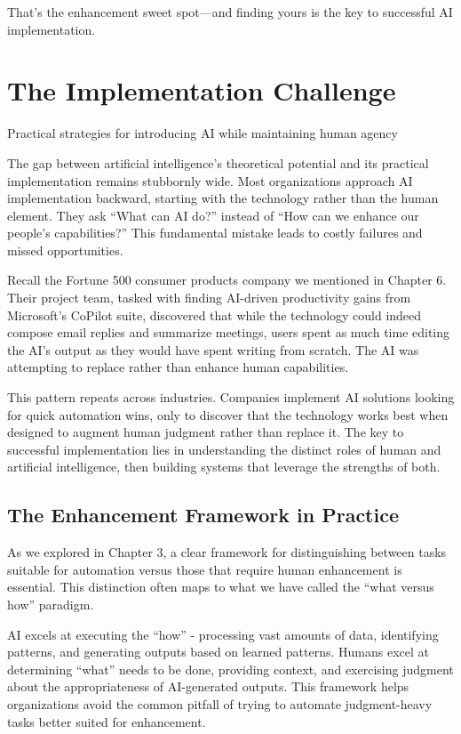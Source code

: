 \documentclass[
  Letterpaper,
]{scrbook}
\begin{document}
That's the enhancement sweet spot---and finding yours is the key to
successful AI implementation.


\chapter{The Implementation
Challenge}\label{the-implementation-challenge}

Practical strategies for introducing AI while maintaining human agency

\hfill\break

The gap between artificial intelligence's theoretical potential and its
practical implementation remains stubbornly wide. Most organizations
approach AI implementation backward, starting with the technology rather
than the human element. They ask ``What can AI do?'' instead of ``How
can we enhance our people's capabilities?'' This fundamental mistake
leads to costly failures and missed opportunities.

Recall the Fortune 500 consumer products company we mentioned in Chapter
6. Their project team, tasked with finding AI-driven productivity gains
from Microsoft's CoPilot suite, discovered that while the technology
could indeed compose email replies and summarize meetings, users spent
as much time editing the AI's output as they would have spent writing
from scratch. The AI was attempting to replace rather than enhance human
capabilities.

This pattern repeats across industries. Companies implement AI solutions
looking for quick automation wins, only to discover that the technology
works best when designed to augment human judgment rather than replace
it. The key to successful implementation lies in understanding the
distinct roles of human and artificial intelligence, then building
systems that leverage the strengths of both.

\section{The Enhancement Framework in
Practice}\label{the-enhancement-framework-in-practice}

As we explored in Chapter 3, a clear framework for distinguishing
between tasks suitable for automation versus those that require human
enhancement is essential. This distinction often maps to what we have
called the ``what versus how'' paradigm.

AI excels at executing the ``how'' - processing vast amounts of data,
identifying patterns, and generating outputs based on learned patterns.
Humans excel at determining ``what'' needs to be done, providing
context, and exercising judgment about the appropriateness of
AI-generated outputs. This framework helps organizations avoid the
common pitfall of trying to automate judgment-heavy tasks better suited
for enhancement.
\end{document}
